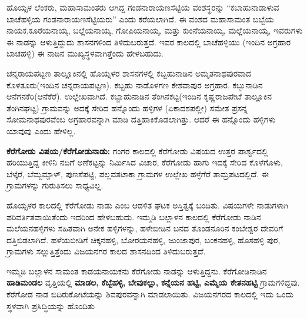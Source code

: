 ಹೊಯ್ಸಳ ಲೆಂಕರು, ಮಹಾಸಾಮಂತರು ಆಗಿದ್ದ ಗಂಡನಾರಾಯಣಸೆಟ್ಟಿಯ ವಂಶಸ್ಥರನ್ನು “ಕಬಾಹುನಾಡಾಳುವ ಬಾಚೆಹಳ್ಳಿಯ ಗಂಡನಾರಾಯಣಸೆಟ್ಟಿಯರು” ಎಂದು ಕರೆಯಲಾಗಿದೆ. ಈ ವಂಶದ ಮಹಾಸಾಮಂತ ಬಬ್ಬೆಯ ನಾಯಕ,\break ಕೂರೆಯನಾಯ್ಕ, ಬಲ್ಲೆಯನಾಯ್ಕ, ಗೋಪಿಯನಾಯ್ಕ, ಮತ್ತು ಕುಂನೆಯನಾಯ್ಕ, ಮಲ್ಲೆಯನಾಯ್ಕ, ಇವರು\-ಗಳು ಈ ನಾಡನ್ನು ಆಳುತ್ತಿದ್ದುದು ಶಾಸನಗಳಿಂದ ತಿಳಿದುಬರುತ್ತದೆ. ಇವರ ಕಾಲದಲ್ಲಿ ಬಾಚೆಹಳ್ಳಿಯು (ಇಂದಿನ ಅಗ್ರಹಾರ ಬಾಚಹಳ್ಳಿ) ಈ ನಾಡಿನ ಮುಖ್ಯಸ್ಥಳವಾಗಿತ್ತೆಂದು ಹೇಳಬಹುದು.

ಚನ್ನರಾಯಪಟ್ಟಣ ತಾಲ್ಲೂಕಿನಲ್ಲಿ ಹೊಯ್ಸಳರ ಶಾಸನಗಳಲ್ಲಿ ಕಬ್ಬಹುನಾಡಿನ ಅಮೃತನಾಥಪುರವಾದ ಕೊಳತೂರು(ಇಂದಿನ ಚನ್ನರಾಯಪಟ್ಟಣ). ಕಬ್ಬಹು ನಾಡೊಳಗಣ ಕೇಶವಾಪುರ ಅಗ್ರಹಾರ. ಕಬ್ಬುನಾಡಿನ ಆನೆಗನಕೆರಿ(ಆನೆಕೆರೆ). ಉಲ್ಲೇಖ\-ವಾಗಿದೆ. ಕಬ್ಬಾಹುನಾಡಿನ ತೆಂಗಿನಕಟ್ಟ(ಇಂದಿನ ಕೃಷ್ಣರಾಜಪೇಟೆ ತಾಲ್ಲೂಕಿನ ತೆಂಗಿನಘಟ್ಟ) ಗ್ರಾಮವನ್ನು ಅದಕ್ಕೆ ಸೇರಿದ ಹನ್ನೊಂದು ಹಳ್ಳಿಗಳ (ಏಕಾದಶಪಲ್ಲೀ) ಸಮೇತ ಪ್ರಸನ್ನ ಸೋಮನಾಥಪುರವೆಂಬ ಅಗ್ರಹಾರವನ್ನಾಗಿ ಮಾಡಿ ದತ್ತಿಹಾಕಿಕೊಡ\-ಲಾಗಿತ್ತು. ಆದರೆ ಈ ಹನ್ನೊಂದು ಹಳ್ಳಿಗಳು ಯಾವುವು ಎಂದು ಹೇಳಿಲ್ಲ.

\textbf{ಕೆರೆಗೋಡು ವಿಷಯ/ಕೆರೆಗೋಡುನಾಡು:} ಗಂಗರ ಕಾಲದಲ್ಲಿ ಕೆರೆಗೋಡು ವಿಷಯದ ಉತ್ತರ ಪಾರ್ಶ್ವದಲ್ಲಿ ಹರಿಯುತ್ತಿದ್ದ ಕೀಳಿನಿ ನದಿಗೆ ಅಣೆಕಟ್ಟನ್ನು ನಿರ್ಮಿಸಿದ ವಿಚಾರ, ಕೆರೆಗೋಡು ಹಾಗು ಇದಕ್ಕೆ ಸೇರಿದ ಕೊಳೆಗೊಳು, ಬೆಳ್ಕೆರೆ, ಬೆಮ್ಬಮ್ಪಾಳ್​, ಪುಣಸೆಪಟ್ಟಿ, ಪಲ್ಲವತಟಾಕಾ ಗ್ರಾಮಗಳ ಉಲ್ಲೇಖ ಹಳ್ಳೆಗೆರೆ ತಾಮ್ರಪಟದಲ್ಲಿದೆ. ಈ ಗ್ರಾಮಗಳನ್ನು ಗುರುತಿಸಲು ಸಾಧ್ಯವಿಲ್ಲ.

ಹೊಯ್ಸಳರ ಕಾಲದಲ್ಲಿ ಕೆರೆಗೋಡು ನಾಡು ಎಂಬ ಆಡಳಿತ ಘಟಕ ಅಸ್ತಿತ್ವಕ್ಕೆ ಬಂದಿತು. ವಿಷಯಗಳೇ ನಾಡುಗಳಾಗಿ ಪರಿವರ್ತಿತವಾಯಿತೆಂದು ಇದರಿಂದ ಹೇಳಬಹುದು. ಇಮ್ಮಡಿ ಬಲ್ಲಾಳನ ಕಾಲದಲ್ಲಿ ಕೆರೆಗೋಡು ನಾಡಿನ ಮಲೆಯನಹಳ್ಳಿಗಳು ಸಹಿತವಾಗಿ ಅನೇಕ ಹಳ್ಳಿಗಳನ್ನು, ಹಳೇಬೀಡಿನ ಬನದ ತೊಂಡನೂರಿನ ಕಂಬೇಶ್ವರ ದೇವರಿಗೆ ದತ್ತಿಬಿಡಲಾಗಿದೆ. ಹಳೆಯಬೀಡಿಗೆ ಚಿಕ್ಕನಹಳ್ಳಿ, ಬೋರಯನಹಳ್ಳಿ, ಜುಂಜಾಪುರ, ಬಂಕನಹಳ್ಳಿ, ಹೊಸಹಳ್ಳಿ ಪುರ, ಗ್ರಾಮಗಳು ಸಲ್ಲುತ್ತಿತ್ತೆಂದು ವಿಜಯನಗರ ಕಾಲದ ಶಾಸನದಿಂದ ತಿಳಿದುಬರುತ್ತದೆ.

ಇಮ್ಮಡಿ ಬಲ್ಲಾಳನ ಸಾಮಂತ ಕಾಡಯನಾಯಕನು ಕೆರೆಗೋಡು ನಾಡನ್ನು ಆಳುತ್ತಿದ್ದನು. ಕೆರೆಗೋಡಿನಾಡಿನ \textbf{ಹಾಡಿಮಂಡಲ }ವೃತ್ತಿಯಲ್ಲಿ \textbf{ಮಾಡಲ,} \textbf{ಕೆಬ್ಬೆಹಳ್ಳಿ,} \textbf{ಬೇವುಕಲ್ಲು,} \textbf{ಕನ್ನೆಯನ ಹಟ್ಟಿ,} \textbf{ಎಮ್ಮೆಯ ಕೇತನಹಟ್ಟಿ} ಗ್ರಾಮಗಳಿದ್ದವು. ಕೆರೆಗೋಡ ನಾಡ ಬಿದಿರುಕೋಟೆಯನ್ನು ಶಿವಪುರವನ್ನಾಗಿ ಮಾಡಲಾಯಿತು. ವಿಜಯನಗರದ ಕಾಲದಲ್ಲಿ ಇದು ಒಂದು ಸ್ಥಳವಾಗಿ ಪ್ರಸಿದ್ಧಿಯನ್ನು ಹೊಂದಿತು

